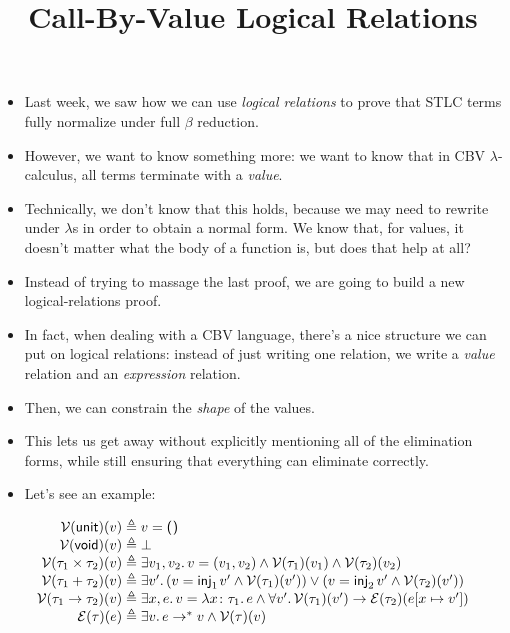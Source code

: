 \documentclass{lecturenotes}
\title{Call-By-Value Logical Relations}
\newcommand{\tabs}[3]{\ensuremath{\lambda #1 \colon #2.\,#3}}
\newcommand{\utype}{\textsf{unit}\xspace}
\newcommand{\unit}{\ensuremath{\textsf{(}\mkern0.5mu\textsf{)}}}
\newcommand{\prodtype}[2]{\ensuremath{#1 \times #2}}
\newcommand{\sumtype}[2]{\ensuremath{#1 + #2}}
\newcommand{\injl}[1]{\ensuremath{\textsf{inj}_1\mkern2mu#1}}
\newcommand{\injr}[1]{\ensuremath{\textsf{inj}_2\mkern3mu#1}}
\newcommand{\vtype}{\textsf{void}\xspace}
\begin{document}
\maketitle

\begin{itemize}
\item Last week, we saw how we can use \emph{logical relations} to prove that STLC terms fully normalize under full $\beta$ reduction.
\item However, we want to know something more: we want to know that in CBV $\lambda$-calculus, all terms terminate with a \emph{value}.
\item Technically, we don't know that this holds, because we may need to rewrite under $\lambda$s in order to obtain a normal form.
  We know that, for values, it doesn't matter what the body of a function is, but does that help at all?
\item Instead of trying to massage the last proof, we are going to build a new logical-relations proof.
\item In fact, when dealing with a CBV language, there's a nice structure we can put on logical relations:
  instead of just writing one relation, we write a \emph{value} relation and an \emph{expression} relation.
\item Then, we can constrain the \emph{shape} of the values.
\item This lets us get away without explicitly mentioning all of the elimination forms, while still ensuring that everything can eliminate correctly.
\item Let's see an example:
\end{itemize}

$$
\begin{array}{r@{\;\triangleq\;}l}
  \mathcal{V}(\utype)(v) & v = \unit\\
  \mathcal{V}(\vtype)(v) & \bot\\
  \mathcal{V}(\prodtype{\tau_1}{\tau_2})(v) & \exists v_1, v_2.\, v = (v_1, v_2) \land \mathcal{V}(\tau_1)(v_1) \land \mathcal{V}(\tau_2)(v_2)\\
  \mathcal{V}(\sumtype{\tau_1}{\tau_2})(v) & \exists v'.\, (v = \injl{v'} \land \mathcal{V}(\tau_1)(v')) \lor (v = \injr{v'} \land \mathcal{V}(\tau_2)(v'))\\
  \mathcal{V}(\tau_1 \to \tau_2)(v) & \exists x, e.\, v = \tabs{x}{\tau_1}{e} \land \forall v'.\, \mathcal{V}(\tau_1)(v') \to \mathcal{E}(\tau_2)(e[x \mapsto v'])\\
  \mathcal{E}(\tau)(e) & \exists v.\, e \to^\ast v \land \mathcal{V}(\tau)(v)
\end{array}
$$
\end{document}
